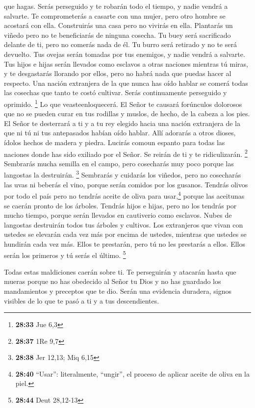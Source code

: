 que hagas. Serás perseguido y te robarán todo el tiempo, y nadie vendrá
a salvarte.  Te comprometerás a casarte con una mujer,
pero otro hombre se acostará con ella. Construirás una casa pero no
vivirás en ella. Plantarás un viñedo pero no te beneficiarás de ninguna
cosecha.  Tu buey será sacrificado delante de ti, pero no
comerás nada de él. Tu burro será retirado y no te será devuelto. Tus
ovejas serán tomadas por tus enemigos, y nadie vendrá a salvarte.
 Tus hijos e hijas serán llevados como esclavos a otras
naciones mientras tú miras, y te desgastarás llorando por ellos, pero no
habrá nada que puedas hacer al respecto.  Una nación
extranjera de la que nunca has oído hablar se comerá todas las cosechas
que tanto te costó cultivar. Serás continuamente perseguido y oprimido.
\footnote{\textbf{28:33} Jue 6,3}  Lo que
veasteenloquecerá.  El Señor te causará forúnculos
dolorosos que no se pueden curar en tus rodillas y muslos, de hecho, de
la cabeza a los pies.  El Señor te desterrará a ti y a tu
rey elegido hacia una nación extranjera de la que ni tú ni tus
antepasados habían oído hablar. Allí adorarás a otros dioses, ídolos
hechos de madera y piedra.  Lucirás comoun espanto para
todas las naciones donde has sido exiliado por el Señor. Se reirán de ti
y te ridiculizarán. \footnote{\textbf{28:37} 1Re 9,7} 
Sembrarás mucha semilla en el campo, pero cosecharás muy poco porque las
langostas la destruirán. \footnote{\textbf{28:38} Jer 12,13; Miq 6,15}
 Sembrarás y cuidarás los viñedos, pero no cosecharás las
uvas ni beberás el vino, porque serán comidos por los gusanos.
 Tendrás olivos por todo el país pero no tendrás aceite
de oliva para usar,\footnote{\textbf{28:40} ``Usar'': literalmente,
  ``ungir'', el proceso de aplicar aceite de oliva en la piel.} porque
las aceitunas se caerán pronto de los árboles.  Tendrás
hijos e hijas, pero no los tendrás por mucho tiempo, porque serán
llevados en cautiverio como esclavos.  Nubes de langostas
destruirán todos tus árboles y cultivos.  Los extranjeros
que vivan con ustedes se elevarán cada vez más por encima de ustedes,
mientras que ustedes se hundirán cada vez más.  Ellos te
prestarán, pero tú no les prestarás a ellos. Ellos serán los primeros y
tú serás el último. \footnote{\textbf{28:44} Deut 28,12-13}

 Todas estas maldiciones caerán sobre ti. Te perseguirán
y atacarán hasta que mueras porque no has obedecido al Señor tu Dios y
no has guardado los mandamientos y preceptos que te dio. 
Serán una evidencia duradera, signos visibles de lo que te pasó a ti y a
tus descendientes.

